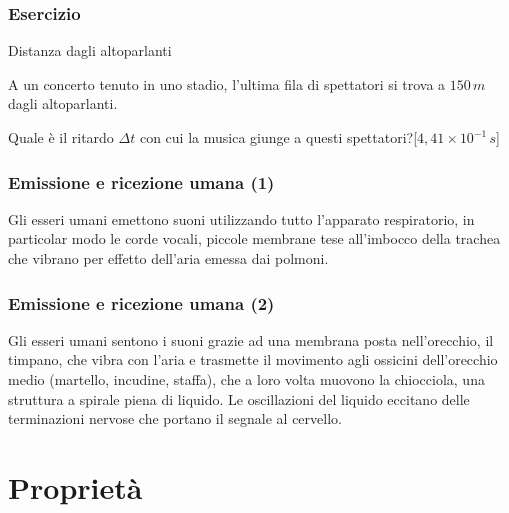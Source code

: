 \documentclass[]{beamer}
\theoremstyle{plain}
\begin{document}
\begin{frame}
\frametitle{Esercizio}
\begin{exampleblock}{Distanza dagli altoparlanti}
\small{A un concerto tenuto in uno stadio, l'ultima fila di spettatori si trova a $ 150 \, m $ dagli altoparlanti.

Quale è il ritardo $ \Delta t $ con cui la musica giunge a questi spettatori?\hspace*{\fill}[$ 4,41 \times 10^{-1} \, s $]}
\end{exampleblock}
\end{frame}



\begin{frame}
\frametitle{Emissione e ricezione umana (1)}
Gli esseri umani emettono suoni utilizzando tutto l'apparato respiratorio, in particolar modo le \alert{corde vocali}, piccole membrane tese all'imbocco della trachea che vibrano per effetto dell'aria emessa dai polmoni.
\end{frame}


\begin{frame}
\frametitle{Emissione e ricezione umana (2)}
Gli esseri umani sentono i suoni grazie ad una membrana posta nell'orecchio, il \alert{timpano}, che vibra con l'aria e trasmette il movimento agli ossicini dell'orecchio medio (martello, incudine, staffa), che a loro volta muovono la chiocciola, una struttura a spirale piena di liquido. Le oscillazioni del liquido eccitano delle terminazioni nervose che portano il segnale al cervello.
\end{frame}

\section{Proprietà}
\end{document}
